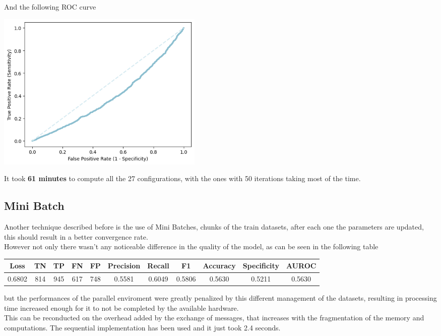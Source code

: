 \documentclass[
	letterpaper, %
	10pt, %
]{class}
\begin{document}
And the following ROC curve

\begin{center}
    \includegraphics[width=10cm]{../images/parallel_roc.png}
\end{center}

It took \textbf{61 minutes} to compute all the 27 configurations, with the ones with 50 iterations taking most of the time.

\subsection{Mini Batch}

Another technique described before is the use of Mini Batches, chunks of the train datasets, after each one the parameters are updated, this should result in a better convergence rate.\\
However not only there wasn't any noticeable difference in the quality of the model, as can be seen in the following table

\begin{center}
    \begin{tabular}{ |c|c|c|c|c|c|c|c|c|c|c| }
        \hline
        Loss   & TN  & TP  & FN  & FP  & Precision & Recall & F1     & Accuracy & Specificity & AUROC  \\
        \hline
        0.6802 & 814 & 945 & 617 & 748 & 0.5581    & 0.6049 & 0.5806 & 0.5630   & 0.5211      & 0.5630 \\
        \hline
    \end{tabular}
\end{center}

but the performances of the parallel enviroment were greatly penalized by this different management of the datasets, resulting in processing time increased enough for it to not be completed by the available hardware.\\
This can be reconducted on the overhead added by the exchange of messages, that increases with the fragmentation of the memory and computations.
The sequential implementation has been used and it just took 2.4 seconds.
\end{document}
